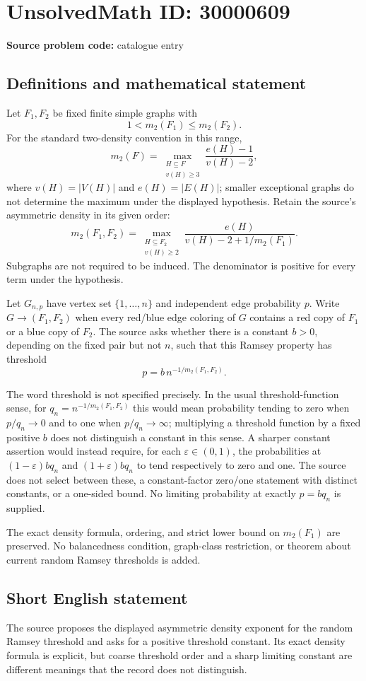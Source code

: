 \documentclass[11pt]{article}
\begin{document}
\section*{UnsolvedMath ID: 30000609}
\textbf{Source problem code:} catalogue entry
\subsection{Definitions and mathematical statement}
Let $F_1,F_2$ be fixed finite simple graphs with
\[
 1<m_2(F_1)\le m_2(F_2).
\]
For the standard two-density convention in this range,
\[
 m_2(F)=\max_{\substack{H\subseteq F\\v(H)\ge3}}
              \frac{e(H)-1}{v(H)-2},
\]
where $v(H)=|V(H)|$ and $e(H)=|E(H)|$; smaller exceptional graphs do not determine the maximum under the displayed hypothesis. Retain the source's asymmetric density in its given order:
\[
 m_2(F_1,F_2)=
 \max_{\substack{H\subseteq F_2\\v(H)\ge2}}
 \frac{e(H)}{v(H)-2+1/m_2(F_1)}.
\]
Subgraphs are not required to be induced. The denominator is positive for every term under the hypothesis.

Let $G_{n,p}$ have vertex set $\{1,\ldots,n\}$ and independent edge probability $p$. Write $G\to(F_1,F_2)$ when every red/blue edge coloring of $G$ contains a red copy of $F_1$ or a blue copy of $F_2$. The source asks whether there is a constant $b>0$, depending on the fixed pair but not $n$, such that this Ramsey property has threshold
\[
 p=b\,n^{-1/m_2(F_1,F_2)}.
\]

The word threshold is not specified precisely. In the usual threshold-function sense, for $q_n=n^{-1/m_2(F_1,F_2)}$ this would mean probability tending to zero when $p/q_n\to0$ and to one when $p/q_n\to\infty$; multiplying a threshold function by a fixed positive $b$ does not distinguish a constant in this sense. A sharper constant assertion would instead require, for each $\varepsilon\in(0,1)$, the probabilities at $(1-\varepsilon)bq_n$ and $(1+\varepsilon)bq_n$ to tend respectively to zero and one. The source does not select between these, a constant-factor zero/one statement with distinct constants, or a one-sided bound. No limiting probability at exactly $p=bq_n$ is supplied.

The exact density formula, ordering, and strict lower bound on $m_2(F_1)$ are preserved. No balancedness condition, graph-class restriction, or theorem about current random Ramsey thresholds is added.
\subsection{Short English statement}
The source proposes the displayed asymmetric density exponent for the random Ramsey threshold and asks for a positive threshold constant. Its exact density formula is explicit, but coarse threshold order and a sharp limiting constant are different meanings that the record does not distinguish.
\end{document}
